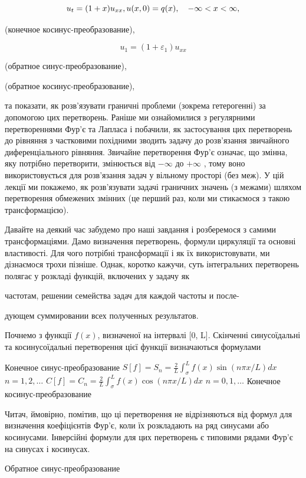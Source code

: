 \documentclass[
  ukrainian,
]{article}
\begin{document}
\[
u_t = (1+x) u_{xx}, \\ u(x, 0) = q(x), \quad -\infty < x < \infty,
\]

(конечное косинус-преобразование),

\[
u_1 = (1 + \varepsilon_1) u_{xx}
\]

(обратное синус-преобразование),

(обратное косинус-преобразование),

та показати, як розв'язувати граничні проблеми (зокрема гетерогенні) за
допомогою цих перетворень. Раніше ми ознайомилися з регулярними
перетвореннями Фур'є та Лапласа і побачили, як застосування цих
перетворень до рівняння з частковими похідними зводить задачу до
розв'язання звичайного диференціального рівняння. Звичайне перетворення
Фур'є означає, що змінна, яку потрібно перетворити, змінюється від
\(-\infty\) до \(+\infty\) , тому воно використовується для розв'язання
задач у вільному просторі (без меж). У цій лекції ми покажемо, як
розв'язувати задачі граничних значень (з межами) шляхом перетворення
обмежених змінних (це перший раз, коли ми стикаємося з такою
трансформацією).

Давайте на деякий час забудемо про наші завдання і розберемося з самими
трансформаціями. Дамо визначення перетворень, формули циркуляції та
основні властивості. Для чого потрібні трансформації і як їх
використовувати, ми дізнаємося трохи пізніше. Однак, коротко кажучи,
суть інтегральних перетворень полягає у розкладі функцій, включених у
задачу як

частотам, решении семейства задач для каждой частоты и после-

дующем суммировании всех полученных результатов.

Почнемо з функції \(f(x)\), визначеної на інтервалі {[}0, L{]}.
Скінченні синусоїдальні та косинусоїдальні перетворення цієї функції
визначаються формулами

Конечное синус-преобразование
\(S[f] = S_n = \frac{2}{L} \int_{\sigma}^{L} f(x) \sin(n\pi x/L) dx\)
\(n = 1, 2, \dots\)
\(C[f] = C_n = \frac{2}{L} \int_{\sigma}^{L} f(x) \cos(n\pi x/L) dx\)
\(n = 0, 1, \dots\) Конечное косинус-преобразование

Читач, ймовірно, помітив, що ці перетворення не відрізняються від формул
для визначення коефіцієнтів Фур'є, коли їх розкладають на ряд синусами
або косинусами. Інверсійні формули для цих перетворень є типовими рядами
Фур'є на синусах і косинусах.

Обратное синус-преобразование
\end{document}
